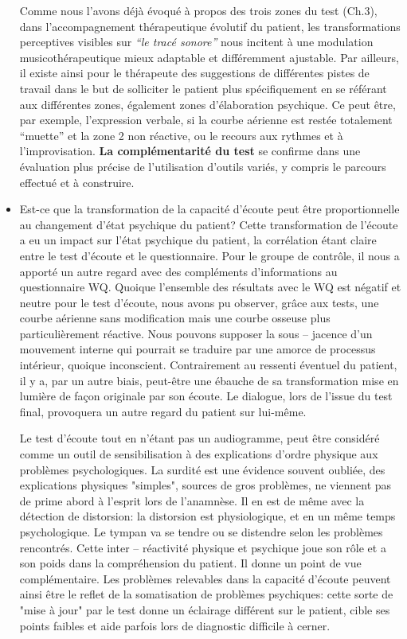 \begin{itemize}
  
 Comme nous l'avons déjà évoqué à propos des trois zones du test (Ch.3), 
 dans l'accompagnement thérapeutique évolutif du patient,
 les transformations perceptives visibles sur
 \textit{``le tracé sonore''} nous incitent à une modulation
 musicothérapeutique mieux adaptable et différemment ajustable.
 Par ailleurs,  il existe ainsi pour le thérapeute des
 suggestions de différentes pistes de travail dans le but de
 solliciter le patient plus spécifiquement en se référant aux
 différentes zones, également zones
 d'élaboration psychique. Ce peut être, par exemple,
 l'expression verbale, si la courbe aérienne est restée
 totalement ``muette'' et la zone 2 non
 réactive, ou le recours aux rythmes et à l'improvisation.
  \textbf{La complémentarité du test} se confirme dans une évaluation plus
 précise de l'utilisation d'outils variés, y compris  le parcours effectué et à
 construire.%
 	\item Est-ce que la transformation de la capacité d'écoute peut être proportionnelle au 
 changement d'état psychique du patient?
   Cette transformation de l'écoute a eu  un impact sur l'état
 psychique du patient, la corrélation étant claire entre le test d'écoute et le questionnaire.
 Pour le groupe de contrôle, il nous a
 apporté un autre regard avec des compléments d'informations au 
 questionnaire
 WQ. Quoique l'ensemble des résultats avec le WQ est
 négatif et neutre pour le
 test d'écoute, nous avons pu observer, grâce aux tests, une 
 courbe 
 aérienne
 sans modification mais une courbe osseuse plus
 particulièrement réactive. 
 Nous pouvons supposer   %
 la sous -- jacence 
 d'un mouvement interne qui pourrait se traduire par 
 une amorce de
 processus intérieur,  quoique inconscient. Contrairement au ressenti éventuel du patient, il y  a, par un 
 autre biais, peut-être une 
 ébauche de sa transformation mise en lumière de façon originale  par son
 écoute. Le dialogue, lors de l'issue du test final,  provoquera un autre 
 regard du patient sur lui-même.
 
 
 Le test d'écoute tout en n'étant pas un audiogramme,  peut  être considéré comme un 
 outil de sensibilisation à des explications 
 d'ordre physique aux problèmes psychologiques. La surdité est une évidence souvent oubliée, des 
 explications physiques "simples", sources de gros problèmes, ne viennent pas de prime abord à l'esprit 
 lors de l'anamnèse. Il en est de même avec la détection de distorsion:
 la distorsion est physiologique, et en un même temps psychologique. Le tympan va se tendre ou se 
 distendre 
 selon les problèmes rencontrés. Cette inter -- réactivité physique et psychique joue son rôle et a son 
 poids dans la compréhension du patient. Il donne un point de vue complémentaire.
  Les problèmes relevables dans la capacité d'écoute peuvent ainsi être  le reflet de la somatisation de 
 problèmes psychiques: 
 cette sorte de  "mise  à jour" par le test donne un éclairage différent sur le patient, cible ses points 
 faibles et aide 
 parfois lors de diagnostic difficile à cerner.
 

\end{itemize}
